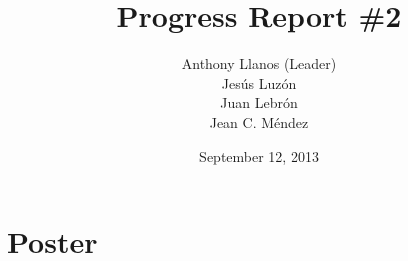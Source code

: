 \documentclass[12pt,letterpaper]{report}
\title{	
	Progress Report \#2
}
\date{September 12, 2013}
\author{Anthony Llanos (Leader)\\ Jes\'{u}s Luz\'{o}n \\ Juan Lebr\'{o}n \\ Jean C. M\'{e}ndez}
\begin{document}
	\maketitle
	\tableofcontents
	\newpage
	
	
	
	\part*{Poster}
	
	
\end{document}
